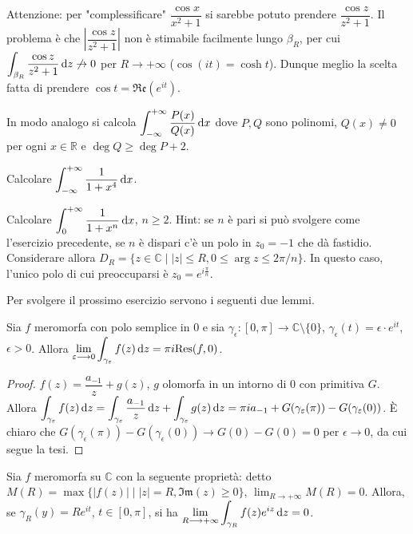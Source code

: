 Attenzione: per "complessificare" $\dfrac{\cos{x}}{x^2+1}$ si sarebbe potuto prendere $\dfrac{\cos{z}}{z^2+1}$.
Il problema è che $\left| \dfrac{\cos{z}}{z^2+1}\right|$ non è stimabile facilmente lungo $\beta_R$, per cui $\displaystyle \int_{\beta_R} \frac{\cos{z}}{z^2+1}\mathop{}\!\mathrm{d} z \not\rightarrow 0$ per $R \longrightarrow +\infty$ ($\cos(it)=\cosh{t}$). Dunque meglio la scelta fatta di prendere $\cos{t}=\mathfrak{Re}(e^{it})$. \marginpar\warningsign

In modo analogo si calcola $\displaystyle \int_{-\infty}^{+\infty} \frac{P(x)}{Q(x)}\mathop{}\!\mathrm{d} x$ dove $P, Q$ sono polinomi, $Q(x) \not=0$ per ogni $x \in \mathbb{R}$ e $\deg{Q} \ge \deg{P}+2$.

\begin{exc}
  Calcolare $\displaystyle \int_{-\infty}^{+\infty} \frac{1}{1+x^4}\mathop{}\!\mathrm{d} x$.
\end{exc}

\begin{exc}
  Calcolare $\displaystyle \int_0^{+\infty} \frac{1}{1+x^n} \mathop{}\!\mathrm{d} x$, $n \ge 2$. Hint: se $n$ è pari si può svolgere come l'esercizio precedente, se $n$ è dispari c'è un polo in $z_0=-1$ che dà fastidio. Considerare allora $D_R=\{z \in \mathbb{C} \mid |z| \le R, 0 \le \arg{z} \le 2\pi/n\}$. In questo caso, l'unico polo di cui preoccuparsi è $z_0=e^{i\frac{\pi}{n}}$.
\end{exc}

Per svolgere il prossimo esercizio servono i seguenti due lemmi.

\begin{lm}
  Sia $f$ meromorfa con polo semplice in $0$ e sia $\gamma_{\epsilon}:[0,\pi] \longrightarrow \mathbb{C}\setminus\{0\}$, $\gamma_{\epsilon}(t)=\epsilon\cdot e^{it}$, $\epsilon>0$. Allora $\displaystyle \lim_{\varepsilon \longrightarrow 0} \int_{\gamma_\varepsilon} f(z)\mathop{}\!\mathrm{d} z=\pi i \text{Res}(f,0)$.
\end{lm}

\begin{proof}
  $f(z)=\dfrac{a_{-1}}{z}+g(z)$, $g$ olomorfa in un intorno di $0$ con primitiva $G$. Allora $\displaystyle \int_{\gamma_\varepsilon} f(z)\mathop{}\!\mathrm{d} z=\int_{\gamma_\varepsilon} \dfrac{a_{-1}}{z}\mathop{}\!\mathrm{d} z+\int_{\gamma_\varepsilon} g(z)\mathop{}\!\mathrm{d} z=\pi i a_{-1}+G(\gamma_\varepsilon(\pi))-G(\gamma_\varepsilon(0))$.
  È chiaro che $G(\gamma_\epsilon(\pi))-G(\gamma_\epsilon(0)) \longrightarrow G(0)-G(0)=0$ per $\epsilon \longrightarrow 0$, da cui segue la tesi.
\end{proof}

\begin{lm}
  Sia $f$ meromorfa su $\mathbb{C}$ con la seguente proprietà: detto $M(R)=\max\{|f(z)| \mid |z|=R, \mathfrak{Im}(z) \ge 0\}$, $\displaystyle \lim_{R \longrightarrow +\infty} M(R)=0$. Allora, se $\gamma_R(y)=Re^{it}$, $t \in [0,\pi]$, si ha $\displaystyle \lim_{R \longrightarrow +\infty} \int_{\gamma_R} f(z)e^{iz}\mathop{}\!\mathrm{d} z=0$.
\end{lm}

